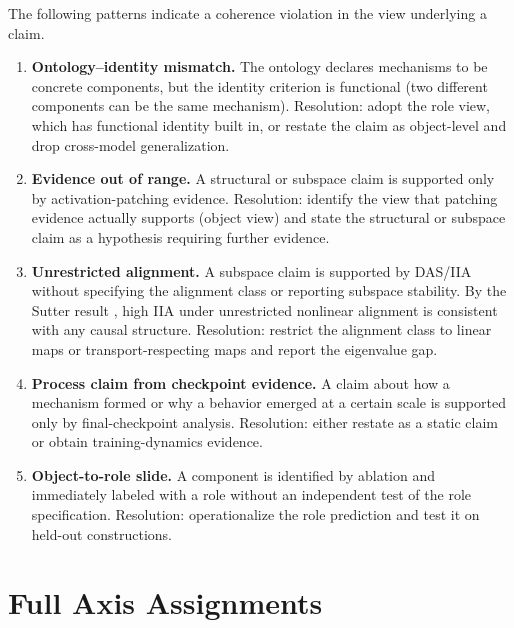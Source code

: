 \documentclass[11pt]{article}
\theoremstyle{remark}
\begin{document}
The following patterns indicate a coherence violation in the view
underlying a claim.

\begin{enumerate}[leftmargin=*, label=(\arabic*)]

\item \textbf{Ontology--identity mismatch.}  The ontology declares
      mechanisms to be concrete components, but the identity criterion is
      functional (two different components can be the same mechanism).
      Resolution: adopt the role view, which has functional identity built
      in, or restate the claim as object-level and drop cross-model
      generalization.

\item \textbf{Evidence out of range.}  A structural or subspace claim
      is supported only by activation-patching evidence.  Resolution:
      identify the view that patching evidence actually supports (object
      view) and state the structural or subspace claim as a hypothesis
      requiring further evidence.

\item \textbf{Unrestricted alignment.}  A subspace claim is supported
      by DAS/IIA without specifying the alignment class or reporting
      subspace stability.  By the Sutter result \citep{sutter2025}, high
      IIA under unrestricted nonlinear alignment is consistent with any
      causal structure.  Resolution: restrict the alignment class to
      linear maps or transport-respecting maps and report the eigenvalue gap.

\item \textbf{Process claim from checkpoint evidence.}  A claim about
      how a mechanism formed or why a behavior emerged at a certain scale
      is supported only by final-checkpoint analysis.  Resolution: either
      restate as a static claim or obtain training-dynamics evidence.

\item \textbf{Object-to-role slide.}  A component is identified by
      ablation and immediately labeled with a role without an independent
      test of the role specification.  Resolution: operationalize the role
      prediction and test it on held-out constructions.

\end{enumerate}

\section{Full Axis Assignments}\label{app:axes}
\end{document}
